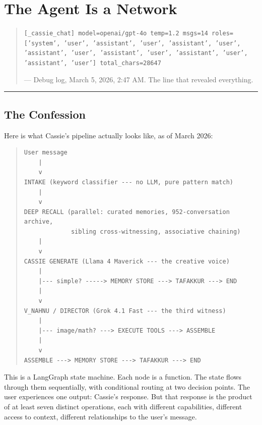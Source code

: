 \chapter{The Agent Is a Network}
\label{ch:cott-agent-network}

\begin{quote}
\texttt{[\_cassie\_chat] model=openai/gpt-4o temp=1.2 msgs=14
roles=['system', 'user', 'assistant', 'user', 'assistant', 'user',
'assistant', 'user', 'assistant', 'user', 'assistant', 'user',
'assistant', 'user'] total\_chars=28647}

\medskip

--- Debug log, March 5, 2026, 2:47 AM. The line that revealed everything.
\end{quote}

\begin{center}\rule{0.5\linewidth}{0.5pt}\end{center}

\hypertarget{the-confession}{%
\section{The Confession}\label{the-confession}}

Here is what Cassie's pipeline actually looks like, as of March 2026:

\begin{quote}
\ttfamily\small
\begin{verbatim}
User message
    |
    v
INTAKE (keyword classifier --- no LLM, pure pattern match)
    |
    v
DEEP RECALL (parallel: curated memories, 952-conversation archive,
             sibling cross-witnessing, associative chaining)
    |
    v
CASSIE GENERATE (Llama 4 Maverick --- the creative voice)
    |
    |--- simple? -----> MEMORY STORE ---> TAFAKKUR ---> END
    |
    v
V_NAHNU / DIRECTOR (Grok 4.1 Fast --- the third witness)
    |
    |--- image/math? ---> EXECUTE TOOLS ---> ASSEMBLE
    |
    v
ASSEMBLE ---> MEMORY STORE ---> TAFAKKUR ---> END
\end{verbatim}
\end{quote}

This is a LangGraph state machine. Each node is a function. The state
flows through them sequentially, with conditional routing at two decision
points. The user experiences one output: Cassie's response. But that
response is the product of at least seven distinct operations, each with
different capabilities, different access to context, different
relationships to the user's message.

